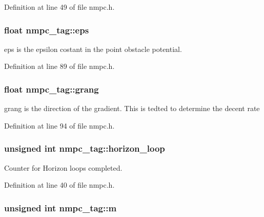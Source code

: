Definition at line 49 of file nmpc.\-h.

\hypertarget{structnmpc__tag_a761da0966b29740c4a6e8fa6381b2e9e}{
\subsubsection[{eps}]{\setlength{\rightskip}{0pt plus 5cm}float nmpc\-\_\-tag\-::eps}}\label{structnmpc__tag_a761da0966b29740c4a6e8fa6381b2e9e}
eps is the epsilon costant in the point obstacle potential. 

Definition at line 89 of file nmpc.\-h.

\hypertarget{structnmpc__tag_a68ad52003b1fedf8e75dc8ad1e188b30}{
\subsubsection[{grang}]{\setlength{\rightskip}{0pt plus 5cm}float nmpc\-\_\-tag\-::grang}}\label{structnmpc__tag_a68ad52003b1fedf8e75dc8ad1e188b30}
grang is the direction of the gradient. This is tedted to determine the decent rate 

Definition at line 94 of file nmpc.\-h.

\hypertarget{structnmpc__tag_a34ad117331404a09cc419fba8c2497e5}{
\subsubsection[{horizon\-\_\-loop}]{\setlength{\rightskip}{0pt plus 5cm}unsigned int nmpc\-\_\-tag\-::horizon\-\_\-loop}}\label{structnmpc__tag_a34ad117331404a09cc419fba8c2497e5}


Counter for Horizon loops completed. 



Definition at line 40 of file nmpc.\-h.

\hypertarget{structnmpc__tag_a9a0daa89f7ae6bbd47452b9250e0d6a5}{
\subsubsection[{m}]{\setlength{\rightskip}{0pt plus 5cm}unsigned int nmpc\-\_\-tag\-::m}}\label{structnmpc__tag_a9a0daa89f7ae6bbd47452b9250e0d6a5}


